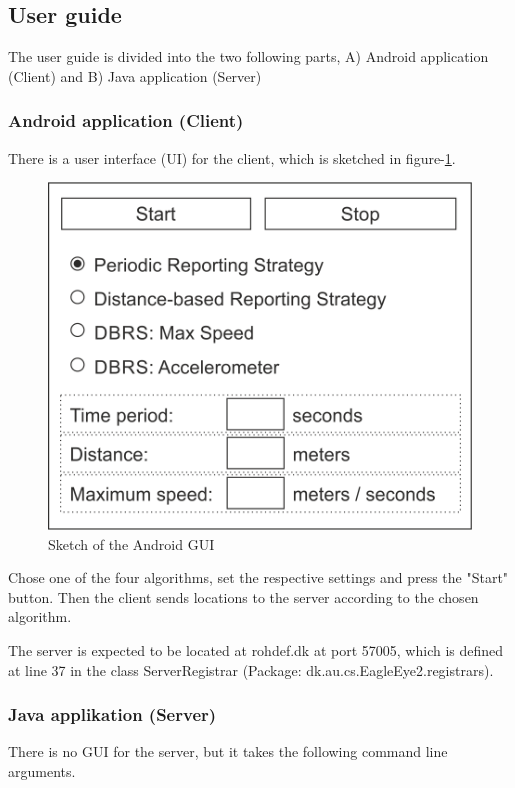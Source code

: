 \subsection{User guide}
The user guide is divided into the two following parts, A) Android application (Client) and B) Java application (Server)

\subsubsection*{Android application (Client)}
There is a user interface (UI) for the client, which is sketched in figure-\ref{androidgui}.

\begin{figure}[h]
\includegraphics{GUI}
\caption{Sketch of the Android GUI}
\label{androidgui}
\end{figure}

Chose one of the four algorithms, set the respective settings and press the "Start" button. Then the client sends locations to the server according to the chosen algorithm.

The server is expected to be located at rohdef.dk at port 57005, which is defined at line 37 in the class ServerRegistrar (Package: dk.au.cs.EagleEye2.registrars).

\subsubsection*{Java applikation (Server)}
There is no GUI for the server, but it takes the following command line arguments.

